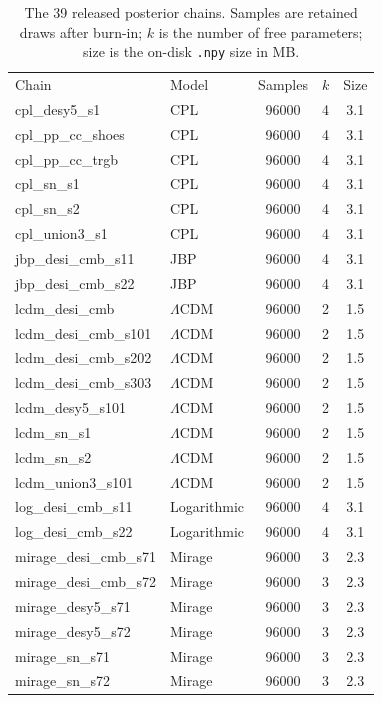 \documentclass[aps,prd,preprint,superscriptaddress,nofootinbib]{revtex4-2}
\begin{document}
\begin{table}[h]
\caption{The 39 released posterior chains. Samples are retained draws after burn-in; $k$ is the number of free parameters; size is the on-disk \texttt{.npy} size in MB.}
\label{tab:chaininv}
\scriptsize
\begin{ruledtabular}
\begin{tabular}{llccc}
Chain & Model & Samples & $k$ & Size \\
\colrule
cpl\_desy5\_s1 & CPL & 96000 & 4 & 3.1 \\
cpl\_pp\_cc\_shoes & CPL & 96000 & 4 & 3.1 \\
cpl\_pp\_cc\_trgb & CPL & 96000 & 4 & 3.1 \\
cpl\_sn\_s1 & CPL & 96000 & 4 & 3.1 \\
cpl\_sn\_s2 & CPL & 96000 & 4 & 3.1 \\
cpl\_union3\_s1 & CPL & 96000 & 4 & 3.1 \\
jbp\_desi\_cmb\_s11 & JBP & 96000 & 4 & 3.1 \\
jbp\_desi\_cmb\_s22 & JBP & 96000 & 4 & 3.1 \\
lcdm\_desi\_cmb & $\Lambda$CDM & 96000 & 2 & 1.5 \\
lcdm\_desi\_cmb\_s101 & $\Lambda$CDM & 96000 & 2 & 1.5 \\
lcdm\_desi\_cmb\_s202 & $\Lambda$CDM & 96000 & 2 & 1.5 \\
lcdm\_desi\_cmb\_s303 & $\Lambda$CDM & 96000 & 2 & 1.5 \\
lcdm\_desy5\_s101 & $\Lambda$CDM & 96000 & 2 & 1.5 \\
lcdm\_sn\_s1 & $\Lambda$CDM & 96000 & 2 & 1.5 \\
lcdm\_sn\_s2 & $\Lambda$CDM & 96000 & 2 & 1.5 \\
lcdm\_union3\_s101 & $\Lambda$CDM & 96000 & 2 & 1.5 \\
log\_desi\_cmb\_s11 & Logarithmic & 96000 & 4 & 3.1 \\
log\_desi\_cmb\_s22 & Logarithmic & 96000 & 4 & 3.1 \\
mirage\_desi\_cmb\_s71 & Mirage & 96000 & 3 & 2.3 \\
mirage\_desi\_cmb\_s72 & Mirage & 96000 & 3 & 2.3 \\
mirage\_desy5\_s71 & Mirage & 96000 & 3 & 2.3 \\
mirage\_desy5\_s72 & Mirage & 96000 & 3 & 2.3 \\
mirage\_sn\_s71 & Mirage & 96000 & 3 & 2.3 \\
mirage\_sn\_s72 & Mirage & 96000 & 3 & 2.3 \\

\end{tabular}
\end{ruledtabular}
\end{table}
\end{document}
